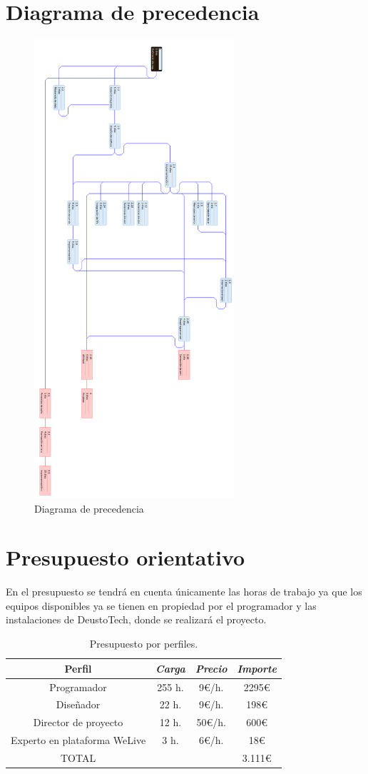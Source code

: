 \documentclass{DeustoFDP}
\begin{document}
\section{Diagrama de precedencia}
\begin{figure}[H]
    \centering
    \includegraphics[width=210pt]{fig/precedencia}
    \caption{Diagrama de precedencia}\label{fig:precedencia}
\end{figure}
\newpage
\section{Presupuesto orientativo}
En el presupuesto se tendrá en cuenta únicamente las horas de trabajo ya que los equipos disponibles ya se tienen en propiedad por el programador y las instalaciones de DeustoTech, donde se realizará el proyecto.
\begin{table}[H]
    \centering
    \caption{Presupuesto por perfiles.}\label{tab:presupuestoperfiles}
    \begin{tabular}{cccc}
        \toprule
        \textbf{Perfil} & \emph{Carga} & \emph{Precio} & \emph{Importe}\\
        \midrule
        Programador  & 255 h.     & 9€/h. & 2295€ \\
        Diseñador   & 22 h.     & 9€/h. & 198€ \\
        Director de proyecto & 12 h.     & 50€/h.  & 600€ \\
        Experto en plataforma WeLive & 3 h.     & 6€/h. & 18€ \\
        TOTAL & & & 3.111€\\
        \bottomrule
    \end{tabular}
\end{table}
\newpage
\end{document}
